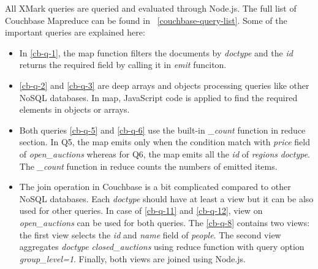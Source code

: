 All XMark queries  are queried and evaluated through Node.js. The full list of Couchbase Mapreduce can be found in ~\ref{couchbase-query-list}. Some of the important queries are explained here:


 \begin{itemize}
 \item  In \ref{cb-q-1}, the map function filters the documents by \textit{doctype} and the \textit{id} returns the required field by calling it in \textit{emit} funciton.
 
 \item \ref{cb-q-2} and \ref{cb-q-3} are deep arrays and objects processing queries like other NoSQL databases. In map,  JavaScript code is applied  to find the required elements in objects or arrays. 
 
 \item Both queries \ref{cb-q-5} and \ref{cb-q-6} use the built-in \textit{\_count} function  in reduce section.  In Q5, the map emits only when the condition match with \textit{price} field of \textit{open\_auctions} whereas for Q6, the map
 emits all the \textit{id} of \textit{regions} \textit{doctype}.  The \textit{\_count} function in reduce counts the numbers of emitted items. 
 
 \item The join operation in Couchbase is a bit complicated compared to other NoSQL databases. Each \textit{doctype} should have at least a view but it can be also used for other queries. In case of \ref{cb-q-11} and \ref{cb-q-12}, view on \textit{open\_auctions} can be used for both queries. The \ref{cb-q-8} contains two views: the first view selects the \textit{id} and \textit{name} field of \textit{people}. The second view aggregates \textit{doctype} \textit{closed\_auctions} using reduce function with query option \textit{group\_level=1}. Finally, both views are joined using Node.js. 
 

\end{itemize}
